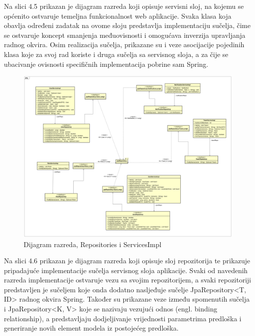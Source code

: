 			Na slici 4.5 prikazan je dijagram razreda koji opisuje servisni sloj, na kojemu se općenito ostvaruje temeljna funkcionalnost web aplikacije. Svaka klasa koja obavlja određeni zadatak na ovome sloju predstavlja implementaciju sučelja, čime se ostvaruje koncept smanjenja međuovisnosti i omogućava inverzija upravljanja radnog okvira. Osim realizacija sučelja, prikazane su i veze asocijacije pojedinih klasa koje za svoj rad koriste i druga sučelja sa servisnog sloja, a za čije se ubacivanje ovisnosti specifičnih implementacija pobrine sam Spring.  
	
			\begin{figure}[H]
				\includegraphics[width=\textwidth]{dijagrami/classDiagram5.PNG} 
				\caption{Dijagram razreda, Repositories i ServicesImpl}
				\label{fig:classDiagram5}
			\end{figure}
		
			Na slici 4.6 prikazan je dijagram razreda koji opisuje sloj repozitorija te prikazuje pripadajuće implementacije sučelja servisnog sloja aplikacije. Svaki od navedenih razreda implementacije ostvaruje vezu sa svojim repozitorijem, a svaki repozitoriji predstavljen je sučeljem koje onda dodatno nasljeđuje sučelje JpaRepository\textless T, ID\textgreater{} radnog okvira Spring. Također su prikazane veze između spomenutih sučelja i JpaRepository\textless K, V\textgreater{} koje se nazivaju vezujući odnos (engl. binding relationship), a predstavljaju dodjeljivanje vrijednosti parametrima predloška i generiranje novih element modela iz postojećeg predloška.    
	
			
			\eject
		
